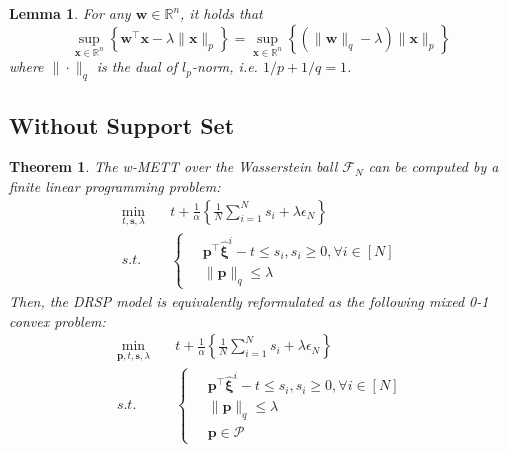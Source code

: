 \documentclass{article}
\newtheorem{thm}{Theorem}
\newtheorem{lem}{Lemma}
\begin{document}
\begin{lem}  \label{lem}
	For any $\bm{w} \in \mathbb{R}^n$, it holds that 
	\begin{equation}
		\sup_{\bm{x} \in \mathbb{R}^n} \left\{\bm{w}^\top \bm{x} - \lambda \|\bm{x}\|_p\right\} = \sup_{\bm{x} \in \mathbb{R}^n} \left\{ (\|\bm{w}\|_q - \lambda) \|\bm{x}\|_p \right\}
	\end{equation}
	where $\| \cdot \|_q$ is the dual of $l_p$-norm, i.e. $1/p + 1/q = 1$. 
\end{lem}

\subsection{Without Support Set}

\begin{thm}
	The w-METT over the Wasserstein ball $\mathcal{F}_N$ can be computed by a finite linear programming problem:
	\begin{align}
		\min_{t, \bm{s}, \lambda} \quad & t + \frac{1}{\alpha} \left\{\frac{1}{N} \sum_{i=1}^{N}s_i + \lambda \epsilon_N\right\} \\
		s.t. \quad & \left\{
		\begin{aligned}
			\ & \bm{p}^\top \hat{\bm{\xi}}^i - t \leq s_i, s_i \geq 0, \forall i \in [N] \\
			& \|\bm{p}\|_q \leq \lambda
		\end{aligned}\right. 
	\end{align}
	Then, the DRSP model is equivalently reformulated as the following mixed 0-1 convex problem:
	\begin{align}
		\min_{\bm{p}, t, \bm{s}, \lambda} \quad & t + \frac{1}{\alpha} \left\{\frac{1}{N} \sum_{i=1}^{N} s_i + \lambda \epsilon_N\right\} \\
		s.t. \quad & \left\{
		\begin{aligned}
			\ & \bm{p}^\top \hat{\bm{\xi}}^i - t \leq s_i, s_i \geq 0, \forall i \in [N] \\
			& \|\bm{p}\|_q \leq \lambda \\
			& \bm{p} \in \mathcal{P}
		\end{aligned} \right. 
	\end{align}
\end{thm}
\end{document}
